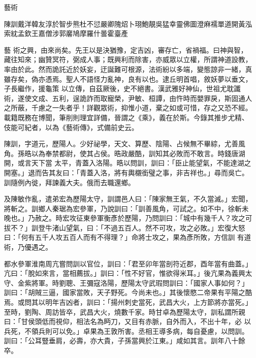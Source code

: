 
\begin{pinyinscope}

 藝術



 陳訓戴洋韓友淳於智步熊杜不愆嚴卿隗炤卜珝鮑靚吳猛幸靈佛圖澄麻襦單道開黃泓索紞孟欽王嘉僧涉郭黁鳩摩羅什曇霍臺產



 藝
 術之興，由來尚矣。先王以是決猶豫，定吉凶，審存亡，省禍福。曰神與智，藏往知來；幽贊冥符，弼成人事；既興利而除害，亦威眾以立權，所謂神道設教，率由於此。然而詭託近於妖妄，迂誕難可根源，法術紛以多端，變態諒非一緒，真雖存矣，偽亦憑焉。聖人不語怪力亂神，良有以也。逮丘明首唱，敘妖夢以垂文，子長繼作，援龜策
 以立傳，自茲厥後，史不絕書。漢武雅好神仙，世祖尤耽讖術，遂使文成、五利，逞詭詐而取寵榮，尹敏、桓譚，由忤時而嬰罪戾，斯固通人之所蔽，千慮之一失者乎！詳觀眾術，抑惟小道，棄之如或可惜，存之又恐不經。載籍既務在博聞，筆削則理宜詳備，晉謂之《乘》，義在於斯。今錄其推步尤精、伎能可紀者，以為《藝術傳》，式備前史云。



 陳訓，字道元，歷陽人。少好祕學，天文、算歷、陰陽、占候無不畢綜，尤善風角。孫晧以為奉禁都尉，使其占侯。晧政嚴酷，訓知其必敗而不敢言。時錢唐湖開，或言天下當
 太平，青蓋入洛陽。晧以問訓，訓曰：「臣止能望氣，不能達湖之開塞。」退而告其友曰：「青蓋入洛，將有輿櫬銜璧之事，非吉祥也。」尋而吳亡。訓隨例內徙，拜諫義大夫。俄而去職還鄉。



 及陳敏作亂，遣弟宏為歷陽太守，訓謂邑人曰：「陳家無王氣，不久當滅。」宏聞，將斬之。訓鄉人秦琚為宏參軍，乃說訓曰：「訓善風角，可試之。如不中，徐斬未晚也。」乃赦之。時宏攻征東參軍衡彥於歷陽，乃問訓曰：「城中有幾千人？攻之可拔不？」訓登牛渚山望氣，曰：「不過五百人。然不可攻，攻之必敗。」宏復大怒曰：「何有五千人攻五百人而有不得理？」命將士攻之，果為彥所敗，方信訓
 有道術，乃優遇之。



 都水參軍淮南周亢嘗問訓以官位，訓曰：「君至卯年當剖符近郡，酉年當有曲蓋。」亢曰：「脫如來言，當相薦拔。」訓曰：「性不好官，惟欲得米耳。」後亢果為義興太守、金紫將軍。時劉聰、王彌寇洛陽，歷陽太守武瑕問訓曰：「國家人事如何？」訓曰：「胡賊三逼，國家當敗，天子野死。今尚未也。」其後懷愍二帝果有平陽之酷焉。或問其以明年吉凶者，訓曰：「揚州刺史當死，武昌大火，上方節將亦當死。」至時，劉陶、周訪皆卒，武昌大火，燒數千家。時甘卓為歷陽太守，訓私謂所親曰：「甘侯頭低而視仰，相法名為眄刀，又目有赤脈，自外而入，不出十年，必
 以兵死，不領兵則可以免。」卓果為王敦所害。丞相王導多病，每自憂慮，以問訓。訓曰：「公耳豎垂肩，必壽，亦大貴，子孫當興於江東。」咸如其言。訓年八十餘卒。




\end{pinyinscope}
